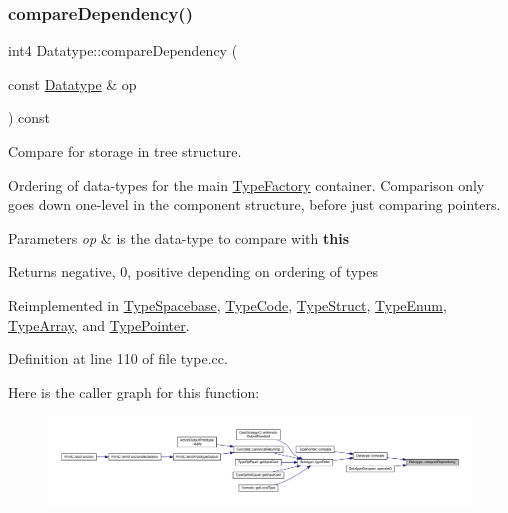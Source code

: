 \subsubsection{\texorpdfstring{compareDependency()}{compareDependency()}}
{\footnotesize\ttfamily int4 Datatype\+::compare\+Dependency (\begin{DoxyParamCaption}\item[{const \mbox{\hyperlink{class_datatype}{Datatype}} \&}]{op }\end{DoxyParamCaption}) const\hspace{0.3cm}{\ttfamily [virtual]}}



Compare for storage in tree structure. 

Ordering of data-\/types for the main \mbox{\hyperlink{class_type_factory}{Type\+Factory}} container. Comparison only goes down one-\/level in the component structure, before just comparing pointers. 
\begin{DoxyParams}{Parameters}
{\em op} & is the data-\/type to compare with {\bfseries{this}} \\
\hline
\end{DoxyParams}
\begin{DoxyReturn}{Returns}
negative, 0, positive depending on ordering of types 
\end{DoxyReturn}


Reimplemented in \mbox{\hyperlink{class_type_spacebase_ae0bea6eed65dda9a50999bf664c70c3d}{Type\+Spacebase}}, \mbox{\hyperlink{class_type_code_a486209b2c4c2efe517f9b5e6a566592e}{Type\+Code}}, \mbox{\hyperlink{class_type_struct_a12078b87b7fbc0f2ed5cb01ee5c61050}{Type\+Struct}}, \mbox{\hyperlink{class_type_enum_a593a6c9e7b9c3db7bbb3f590d8f3f202}{Type\+Enum}}, \mbox{\hyperlink{class_type_array_a10550a6f660c7c7a4f06ca00eae2319f}{Type\+Array}}, and \mbox{\hyperlink{class_type_pointer_a20dfb07c24c08242c21ae856508197fe}{Type\+Pointer}}.



Definition at line 110 of file type.\+cc.

Here is the caller graph for this function\+:
\nopagebreak
\begin{figure}[H]
\begin{center}
\leavevmode
\includegraphics[width=350pt]{class_datatype_ab26e4ca2c3091d3c5a34b4fbd7be76ae_icgraph}
\end{center}
\end{figure}
\mbox{\label{class_datatype_a512d26d59082eeaef1351a7c448d6447}} 
